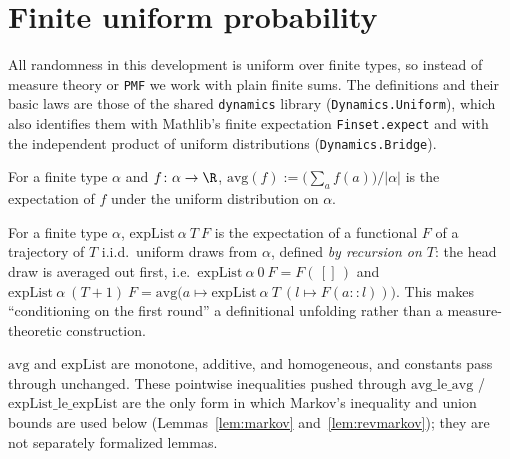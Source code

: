 \section{Finite uniform probability}\label{sec:prelim}

All randomness in this development is uniform over finite types, so instead
of measure theory or \texttt{PMF} we work with plain finite sums. The
definitions and their basic laws are those of the shared \texttt{dynamics}
library (\texttt{Dynamics.Uniform}), which also identifies them with Mathlib's
finite expectation \texttt{Finset.expect} and with the independent product of
uniform distributions (\texttt{Dynamics.Bridge}).

\begin{definition}[Average]\label{def:avg}
  \leanok
  For a finite type $\alpha$ and $f \colon \alpha \to \R$,
  $\mathrm{avg}(f) := \bigl(\sum_{a} f(a)\bigr) / |\alpha|$ is the
  expectation of $f$ under the uniform distribution on $\alpha$.
\end{definition}

\begin{definition}\label{def:expList}
  \leanok
  For a finite type $\alpha$, $\mathrm{expList}\ \alpha\ T\ F$ is the
  expectation of a functional $F$ of a trajectory of $T$ i.i.d.\ uniform
  draws from $\alpha$, defined \emph{by recursion on $T$}: the head draw is
  averaged out first, i.e.\ $\mathrm{expList}\ \alpha\ 0\ F = F(\,[]\,)$ and
  $\mathrm{expList}\ \alpha\ (T{+}1)\ F
    = \mathrm{avg}\bigl(a \mapsto \mathrm{expList}\ \alpha\ T\ (l \mapsto
    F(a :: l))\bigr)$.
  This makes ``conditioning on the first round'' a definitional unfolding
  rather than a measure-theoretic construction.
\end{definition}

\begin{lemma}\label{lem:avg-basic}
  \leanok
  $\mathrm{avg}$ and $\mathrm{expList}$ are monotone, additive, and
  homogeneous, and constants pass through unchanged. These pointwise
  inequalities pushed through $\mathrm{avg\_le\_avg}$ /
  $\mathrm{expList\_le\_expList}$ are the only form in which Markov's
  inequality and union bounds are used below (Lemmas~\ref{lem:markov}
  and~\ref{lem:revmarkov}); they are not separately formalized lemmas.
\end{lemma}

